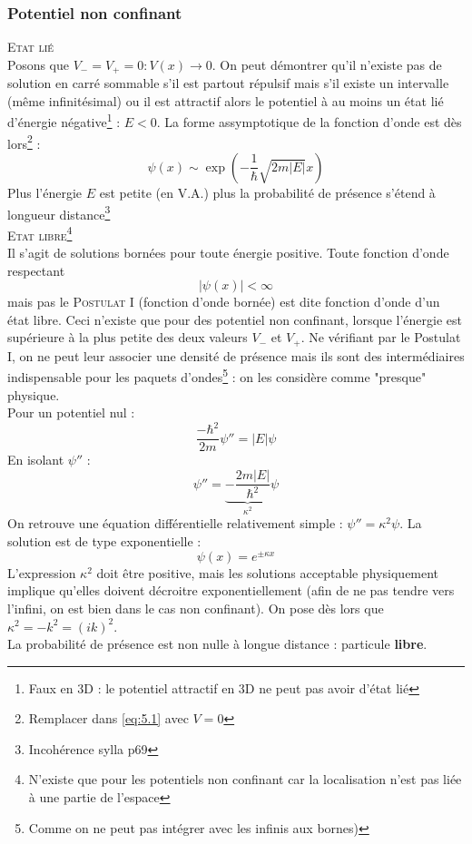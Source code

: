 \documentclass	[11pt, a4paper, openany]{book}
\begin{document}
\subsubsection*{Potentiel non confinant}
\textsc{Etat lié}\\
Posons que $V_- = V_+ = 0 : V(x) \rightarrow 0$. On peut démontrer qu'il n'existe pas de solution en carré sommable s'il est partout répulsif mais s'il existe un intervalle (même infinitésimal) ou il est attractif alors le potentiel à au moins un état lié d'énergie négative\footnote{Faux en 3D : le potentiel attractif en 3D ne peut pas avoir d'état lié} : $E <0$. La forme assymptotique de la fonction d'onde est dès lors\footnote{Remplacer dans \eqref{eq:5.1} avec $V=0$} :
\begin{equation}
\psi(x) \sim \exp\left(-\frac{1}{\hbar}\sqrt{2m|E|}x\right)
\end{equation}
Plus l'énergie $E$ est petite (en V.A.) plus la probabilité de présence s'étend à longueur distance\footnote{Incohérence sylla p69}\\

\textsc{Etat libre}\footnote{N'existe que pour les potentiels non confinant car la localisation n'est pas liée à une partie de l'espace}\\
Il s'agit de solutions bornées pour toute énergie positive. Toute fonction d'onde respectant 
\begin{equation}
|\psi(x)| < \infty
\end{equation}
mais pas le \textsc{Postulat I} (fonction d'onde bornée) est dite fonction d'onde d'un état libre. Ceci n'existe que pour des potentiel non confinant, lorsque l'énergie est supérieure à la plus petite des deux valeurs $V_-$ et $V_+$. Ne vérifiant par le Postulat I, on ne peut leur associer une densité de présence mais ils sont des intermédiaires indispensable pour les paquets d'ondes\footnote{Comme on ne peut pas intégrer avec les infinis aux bornes)} : on les considère comme "presque" physique. \\
Pour un potentiel nul :
\begin{equation}
\frac{-\hbar^2}{2m}\psi'' = |E|\psi
\end{equation}
En isolant $\psi''$ :
\begin{equation}
\psi'' = \underbrace{-\dfrac{2m|E|}{\hbar^2}}_{\kappa^2}\psi
\end{equation}
On retrouve une équation différentielle relativement simple : $\psi'' = \kappa^2\psi$. La solution est de type exponentielle :
\begin{equation}
\psi(x) = e^{\pm \kappa x}
\end{equation}
L'expression $\kappa^2$ doit être positive, mais les solutions acceptable physiquement implique qu'elles doivent décroitre exponentiellement (afin de ne pas tendre vers l'infini, on est bien dans le cas non confinant). On pose dès lors que $\kappa^2 = -k^2 = (ik)^2$.\\
La probabilité de présence est non nulle à longue distance : particule \textbf{libre}.
\end{document}
